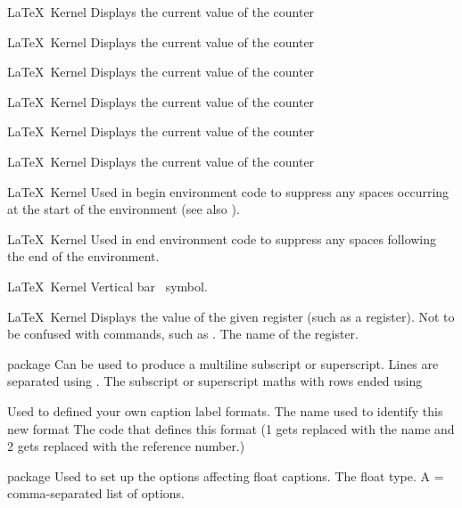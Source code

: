 %
 {}%
 {\LaTeX\ Kernel}%
 {Displays the current value of the  counter}%
 {}

%
 {}%
 {\LaTeX\ Kernel}%
 {Displays the current value of the  counter}%
 {}

%
 {}%
 {\LaTeX\ Kernel}%
 {Displays the current value of the  counter}%
 {}

%
 {}%
 {\LaTeX\ Kernel}%
 {Displays the current value of the  counter}%
 {}

%
 {}%
 {\LaTeX\ Kernel}%
 {Displays the current value of the  counter}%
 {}

%
 {}%
 {\LaTeX\ Kernel}%
 {Displays the current value of the  counter}%
 {}

 {}
 {\LaTeX\ Kernel}
 {Used in begin environment code to suppress any spaces occurring 
  at the start of the environment (see also ).}
 {}

%
 {}%
 {\LaTeX\ Kernel}%
 {Used in end environment code to suppress any spaces following the
  end of the environment.}%
 {}

%
 {}%
 {\LaTeX\ Kernel}%
 {Vertical bar \textbar\ symbol.}%
 {}

%
 {}%
 {\LaTeX\ Kernel}%
 {Displays the value of the given register (such as a  register).
  Not to be confused with  commands, such as .}%
 {%
   \BeginArgList
      The name of the register.
   \EndArgList
 }

%
 {}%
 { package}%
 {Can be used to produce a multiline subscript or superscript. Lines
  are separated using .}%
 {%
   \BeginArgList
     The subscript or superscript maths with rows
      ended using 
   \EndArgList
 }

 {}
 {}
 {Used to defined your own caption label formats.}
 {%
   \BeginArgList
      The name used to identify this new format
      The code that defines this format
     (1 gets replaced with the name and 2
     gets replaced with the reference number.)
   \EndArgList
 }

 {}
 { package}
 {Used to set up the options affecting float captions.}
 {%
   \BeginArgList
      The float type.
      A =
     comma-separated list of options.
   \EndArgList
 }

